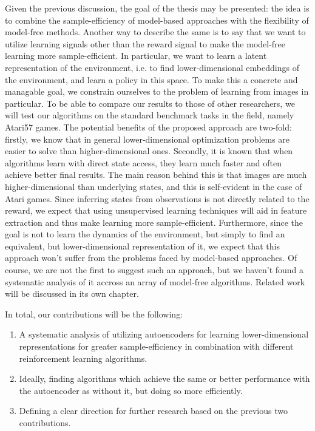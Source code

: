 Given the previous discussion, the goal of the thesis may be presented:
the idea is to combine the sample-efficiency of model-based approaches
with the flexibility of model-free methods.
Another way to describe the same is to say that we want
to utilize learning signals other than the reward signal
to make the model-free learning more sample-efficient.
In particular, we want to learn a latent representation of the environment,
i.e. to find lower-dimensional embeddings of the environment,
and learn a policy in this space.
To make this a concrete and managable goal,
we constrain ourselves to the problem of learning from images in particular.
To be able to compare our results to those of other researchers,
we will test our algorithms on the standard benchmark tasks in the field,
namely Atari57 games.
The potential benefits of the proposed approach are two-fold:
firstly, we know that in general lower-dimensional optimization problems
are easier to solve than higher-dimensional ones.
Secondly, it is known that when algorithms learn with direct state access,
they learn much faster and often achieve better final results.
The main reason behind this is that images are much higher-dimensional
than underlying states, and this is self-evident in the case of Atari games.
Since inferring states from observations is not directly related to the reward,
we expect that using unsupervised learning techniques will aid in feature extraction
and thus make learning more sample-efficient.
Furthermore, since the goal is not to learn the dynamics of the environment,
but simply to find an equivalent, but lower-dimensional representation of it,
we expect that this approach won't suffer from the problems faced
by model-based approaches.
Of course, we are not the first to suggest such an approach,
but we haven't found a systematic analysis of it accross an array of
model-free algorithms.
Related work will be discussed in its own chapter.

In total, our contributions will be the following:
\begin{enumerate}
	\item A systematic analysis of utilizing autoencoders for learning lower-dimensional
	representations for greater sample-efficiency in combination with different
	reinforcement learning algorithms.
	\item Ideally, finding algorithms which achieve the same or better performance with the autoencoder
	as without it, but doing so more efficiently.
	\item Defining a clear direction for further research based on the previous two contributions.
\end{enumerate}





